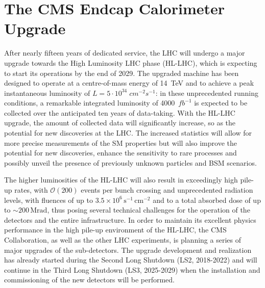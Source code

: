 



\chapter{The CMS Endcap Calorimeter Upgrade}

After nearly fifteen years of dedicated service, the LHC will undergo a major upgrade towards the High Luminosity LHC phase (HL-LHC), which is expecting to start its operations by the end of 2029.
The upgraded machine has been designed to operate at a  centre-of-mass energy of 14~TeV and to achieve a peak instantaneous luminosity of $L=5\cdot10^{34}\;cm^{-2}s^{-1}$: in these unprecedented running conditions, a remarkable integrated luminosity of 4000~$fb^{-1}$ is expected to be collected over the anticipated ten years of data-taking. 
With the HL-LHC upgrade, the amount of collected data will significantly increase, so as the potential for new discoveries at the LHC. The increased statistics will allow for more precise measurements of the SM properties but will also improve the potential for new discoveries, enhance the sensitivity to rare processes and possibly unveil the presence of previously unknown particles and BSM scenarios.

The higher luminosities of the HL-LHC will also result in exceedingly high pile-up rates, with $\mathcal{O}(200)$ events per bunch crossing and unprecedented radiation levels, with fluences of up to $3.5\times10^6\,\textrm{s}^{-1}\,\textrm{cm}^{-2}$ and to a total absorbed dose of up to $\sim$$200\,\textrm{Mrad}$, thus posing several technical challenges for the operation of the detectors and the entire infrastructure.
In order to maintain its excellent physics performance in the high pile-up environment of the HL-LHC, the CMS Collaboration, as well as the other LHC experiments, is planning a series of major upgrades of the sub-detectors. The upgrade development and realization has already started during the Second Long Shutdown (LS2, 2018-2022) and will continue in the Third Long Shutdown (LS3, 2025-2029) when the installation and commissioning of the new detectors will be performed. 

